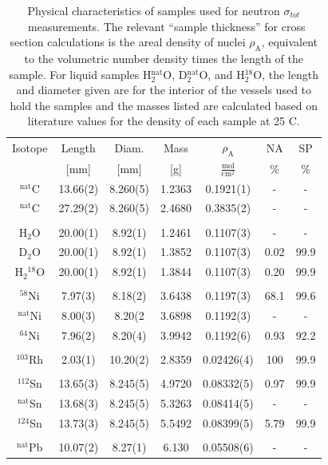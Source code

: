 \documentclass[twocolumn,secnumarabic,amssymb, nobibnotes, aps, prl,
superscriptaddress, nobalancelastpage, draft]{revtex4}
\newcommand{\tot}{\ensuremath{\sigma_{tot}}}
\begin{document}
\begin{table}[tb]
    \centering
    \begin{tabular}{c c c c c c c}
        \small Isotope & Length & Diam. & Mass & $\rho_{\text{A}}$ & NA & SP\\
        \small & [mm] & [mm] & [g] & $\frac{\textrm{mol}}{\textrm{cm}^{2}}$ & \% & \%\\
        \hline
        $^{\text{nat}}$C& 13.66(2)& 8.260(5)& 1.2363& 0.1921(1)& -& -\\
        $^{\text{nat}}$C& 27.29(2)& 8.260(5)& 2.4680& 0.3835(2)& -& -\\
        \\
        H$_{2}$O& 20.00(1)& 8.92(1)& 1.2461& 0.1107(3)& -& - \\
        D$_{2}$O& 20.00(1)& 8.92(1)& 1.3852& 0.1107(3)& 0.02& 99.9\\
        H$_{2}$$^{18}$O& 20.00(1)& 8.92(1)& 1.3844& 0.1107(3)& 0.20& 99.9\\
        \\
        $^{58}$Ni& 7.97(3)& 8.18(2)& 3.6438& 0.1197(3)& 68.1& 99.6 \\
        $^{\text{nat}}$Ni& 8.00(3)& 8.20(2 & 3.6898& 0.1192(3)& - & -\\
        $^{64}$Ni& 7.96(2)& 8.20(4)& 3.9942& 0.1192(6)& 0.93& 92.2\\
        \\
        $^{103}$Rh& 2.03(1)& 10.20(2)& 2.8359& 0.02426(4)& 100& 99.9\\
        \\
        $^{112}$Sn& 13.65(3)& 8.245(5)& 4.9720& 0.08332(5)& 0.97& 99.9\\
        $^{\text{nat}}$Sn& 13.68(3)& 8.245(5)& 5.3263& 0.08414(5)& - & -\\
        $^{124}$Sn& 13.73(3)& 8.245(5)& 5.5492& 0.08399(5)& 5.79& 99.9\\
        \\
        $^{\text{nat}}$Pb& 10.07(2)& 8.27(1)& 6.130& 0.05508(6)& -& -\\
        \hline
    \end{tabular}
    \centering
    \caption{Physical characteristics of samples used for neutron \tot\ measurements.
The relevant ``sample thickness'' for cross section calculations is the areal density of nuclei
        $\rho_{\text{A}}$, equivalent to the volumetric number density times
        the length of the sample. For liquid
        samples H$_{2}^{\text{nat}}$O, D$_{2}^{\text{nat}}$O, and H$_{2}^{18}$O,
        the length and diameter given are for the interior of the vessels
        used to hold the samples and the masses listed are calculated based on 
        literature values for the density of each sample at 25 C.}
    \label{SampleCharacteristics}
\end{table}
\end{document}
